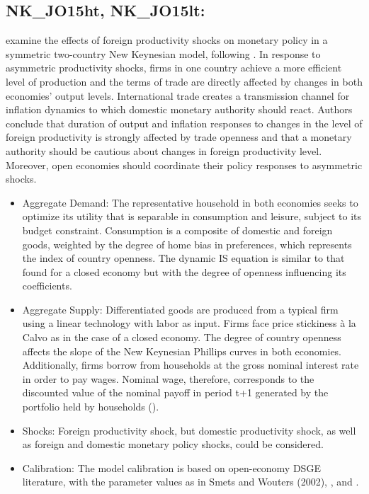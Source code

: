 \documentclass[11pt,a4paper]{article}
\begin{document}
	\subsection{NK\_JO15ht, NK\_JO15lt: \texorpdfstring{\cite{jang2015okano}}{Jang and Okano (2015)}}
	\label{NKJO15}
	\cite{jang2015okano} examine the effects of foreign productivity shocks on monetary policy in a symmetric two-country New Keynesian model, following \cite{GaliMonacelli2005}. In response to asymmetric productivity shocks, firms in one country achieve a more efficient level of production and the terms of trade are directly affected by changes in both economies' output levels. International trade creates a transmission channel for inflation dynamics to which domestic monetary authority should react. Authors conclude that duration of output and inflation responses to changes in the level of foreign productivity is strongly affected by trade openness and that a monetary authority should be cautious about changes in foreign productivity level. Moreover, open economies should coordinate their policy responses to asymmetric shocks. 
	
	\begin{itemize}
		\item Aggregate Demand: The representative household in both economies seeks to optimize its utility that is separable in consumption and leisure, subject to its budget constraint. Consumption is a composite of domestic and foreign goods, weighted by the degree of home bias in preferences, which represents the index of country openness. The dynamic IS equation is similar to that found for a closed economy but with the degree of openness influencing its coefficients.
		
		\item Aggregate Supply: Differentiated goods are produced from a typical firm using a linear technology with labor as input. Firms face price stickiness \`{a} la Calvo as in the case of a closed economy. The degree of country openness affects the slope of the New Keynesian Phillips curves in both economies. Additionally, firms borrow from households at the gross nominal interest rate in order to pay wages. Nominal wage, therefore, corresponds to the discounted value of the nominal payoff in period t+1 generated by the portfolio held by households (\cite{RavennaWalsh2006}).
		
		
		\item Shocks: Foreign productivity shock, but domestic productivity shock, as well as foreign and domestic monetary policy shocks, could be considered.
		
		\item Calibration: The model calibration is based on open-economy DSGE literature, with the parameter values as in Smets and Wouters (2002), \cite{faia2008optimal}, and \cite{rabanal2010euro}. 
	\end{itemize}
	
\end{document}
